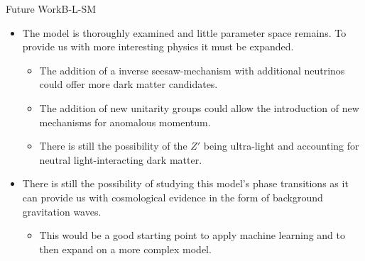 \documentclass[10pt,xcolor=dvipsnames,mathserif]{beamer}
\begin{document}
\begin{frame}{Future Work}{B-L-SM}
\begin{itemize}
    \item The model is thoroughly examined and little parameter space remains. To provide us with more interesting physics it must be expanded. 
    \begin{itemize}
        \item The addition of a inverse seesaw-mechanism with additional neutrinos could offer more dark matter candidates. 
        \item The addition of new unitarity groups could allow the introduction of new mechanisms for anomalous momentum. 
        \item There is still the possibility of the $Z'$ being ultra-light and accounting for neutral light-interacting dark matter. 
    \end{itemize}
    \item There is still the possibility of studying this model's phase transitions as it can provide us with cosmological evidence in the form of background gravitation waves.
    \begin{itemize}
        \item This would be a good starting point to apply machine learning and to then expand on a more complex model. 
    \end{itemize}
\end{itemize}
\end{frame} 
\end{document}
